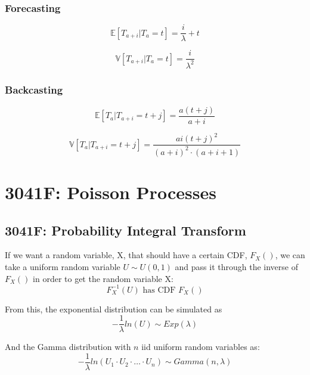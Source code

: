 \documentclass[12pt]{article}
\begin{document}
\subsubsection{Forecasting}
\begin{equation}
    \mathbb{E}[T_{a + i} | T_a = t] = \frac{i}{\lambda} + t
\end{equation}

\begin{equation}
    \mathbb{V}[T_{a + i} | T_a = t] = \frac{i}{\lambda^2}
\end{equation}


\subsubsection{Backcasting}
\begin{equation}
    \mathbb{E}[T_a | T_{a + i} = t + j] = \frac{a(t + j)}{a + i}
\end{equation}

\begin{equation}
    \mathbb{V}[T_a | T_{a + i} = t + j] = 
    \frac{ ai(t + j)^2 }{ (a + i)^2 \cdot (a + i + 1) }
\end{equation}
\section{3041F: Poisson Processes}
\subsection{3041F: Probability Integral Transform}
If we want a random variable, X, that should have a certain CDF, \(F_X()\),
we can take a uniform random variable \(U \sim U(0, 1)\) and 
pass it through the inverse of \(F_X()\) in order to get the random variable X:
\begin{equation*}
    F_X^{-1}(U) \text{ has CDF } F_X()
\end{equation*}


From this, the exponential distribution can be simulated as 
\begin{equation*}
    -\frac{1}{\lambda}ln(U) \sim Exp(\lambda)
\end{equation*}

And the Gamma distribution with \(n\) iid uniform random variables as:
\begin{equation*}
    -\frac{1}{\lambda}ln(U_1 \cdot U_2 \cdot \dots \cdot U_n) \sim Gamma(n, \lambda)
\end{equation*}
\end{document}
